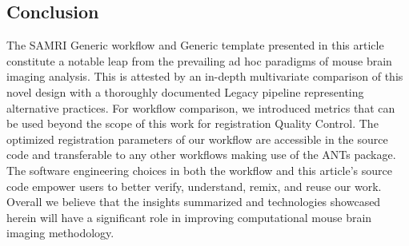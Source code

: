 \subsection{Conclusion}

The SAMRI Generic workflow and Generic template presented in this article constitute a notable leap from the prevailing ad hoc paradigms of mouse brain imaging analysis.
This is attested by an in-depth multivariate comparison of this novel design with a thoroughly documented Legacy pipeline representing alternative practices.
For workflow comparison, we introduced metrics that can be used beyond the scope of this work for registration Quality Control.
The optimized registration parameters of our workflow are accessible in the source code and transferable to any other workflows making use of the ANTs package.
The software engineering choices in both the workflow and this article's source code empower users to better verify, understand, remix, and reuse our work.
Overall we believe that the insights summarized and technologies showcased herein will have a significant role in improving computational mouse brain imaging methodology.
